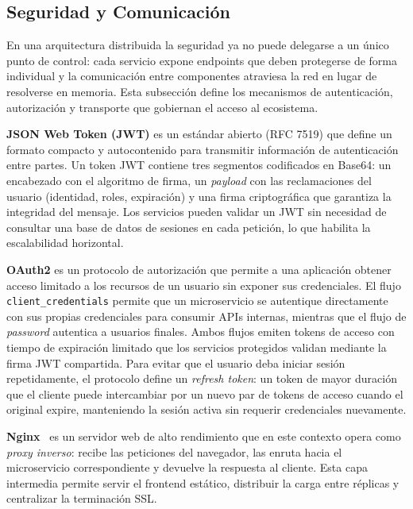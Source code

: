 \subsection{Seguridad y Comunicaci\'{o}n}

En una arquitectura distribuida la seguridad ya no puede delegarse a un \'{u}nico punto de control: cada servicio expone endpoints que deben protegerse de forma individual y la comunicaci\'{o}n entre componentes atraviesa la red en lugar de resolverse en memoria. Esta subsecci\'{o}n define los mecanismos de autenticaci\'{o}n, autorizaci\'{o}n y transporte que gobiernan el acceso al ecosistema.

\textbf{JSON Web Token (JWT)} es un est\'{a}ndar abierto (RFC 7519) \cite{rfc7519} que define un formato compacto y autocontenido para transmitir informaci\'{o}n de autenticaci\'{o}n entre partes. Un token JWT contiene tres segmentos codificados en Base64: un encabezado con el algoritmo de firma, un \textit{payload} con las reclamaciones del usuario (identidad, roles, expiraci\'{o}n) y una firma criptogr\'{a}fica que garantiza la integridad del mensaje. Los servicios pueden validar un JWT sin necesidad de consultar una base de datos de sesiones en cada petici\'{o}n, lo que habilita la escalabilidad horizontal.

\textbf{OAuth2} \cite{rfc6749} es un protocolo de autorizaci\'{o}n que permite a una aplicaci\'{o}n obtener acceso limitado a los recursos de un usuario sin exponer sus credenciales. El flujo \texttt{client\_credentials} permite que un microservicio se autentique directamente con sus propias credenciales para consumir APIs internas, mientras que el flujo de \textit{password} autentica a usuarios finales. Ambos flujos emiten tokens de acceso con tiempo de expiraci\'{o}n limitado que los servicios protegidos validan mediante la firma JWT compartida. Para evitar que el usuario deba iniciar sesi\'{o}n repetidamente, el protocolo define un \textit{refresh token}: un token de mayor duraci\'{o}n que el cliente puede intercambiar por un nuevo par de tokens de acceso cuando el original expire, manteniendo la sesi\'{o}n activa sin requerir credenciales nuevamente.

\textbf{Nginx}~\cite{nginx2024} es un servidor web de alto rendimiento que en este contexto opera como \textit{proxy inverso}: recibe las peticiones del navegador, las enruta hacia el microservicio correspondiente y devuelve la respuesta al cliente. Esta capa intermedia permite servir el frontend est\'{a}tico, distribuir la carga entre r\'{e}plicas y centralizar la terminaci\'{o}n SSL.

